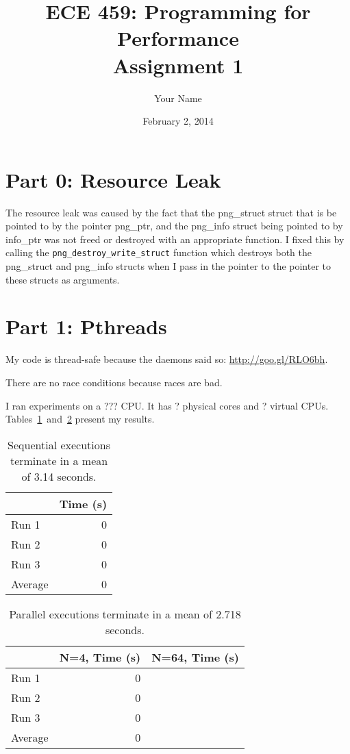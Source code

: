 \documentclass[12pt]{article}
\title{ECE 459: Programming for Performance\\Assignment 1}
\author{Your Name}
\date{February 2, 2014}
\newcommand{\physicalcores}{?}
\newcommand{\virtualcpus}{?}
\begin{document}
\maketitle

\section*{Part 0: Resource Leak}

The resource leak was caused by the fact that the png_struct struct that is be pointed to by the pointer png_ptr, and the png_info struct being pointed to by info_ptr was not freed or destroyed with an appropriate function. I fixed this by calling the {\tt png_destroy_write_struct} function which destroys both the png_struct and png_info structs when I pass in the pointer to the pointer to these structs as arguments.

\section*{Part 1: Pthreads}

My code is thread-safe because the daemons said so: \url{http://goo.gl/RLO6bh}. 

There are no race conditions because races are bad.

I ran experiments on a ??? CPU. It has \physicalcores{} physical cores and \virtualcpus{} virtual
CPUs. Tables~\ref{tbl_sequential}~and~\ref{tbl_parallel} present my results.

\begin{table}[H]
  \centering
  \begin{tabular}{lr}
    & {\bf Time (s)} \\
    \hline
    Run 1 & 0 \\
    Run 2 & 0 \\
    Run 3 & 0 \\
    \hline
    Average & 0 \\
  \end{tabular}
  \caption{\label{tbl_sequential}Sequential executions terminate in a mean of 3.14 seconds.}
\end{table}

\begin{table}[H]
  \centering
  \begin{tabular}{lrr}
    & {\bf N=4, Time (s)} & {\bf N=64, Time (s)} \\
    \hline
    Run 1 & 0 \\
    Run 2 & 0 \\
    Run 3 & 0 \\
    \hline
    Average & 0 \\
  \end{tabular}
  \caption{\label{tbl_parallel}Parallel executions terminate in a mean of 2.718 seconds.}
\end{table}
\end{document}

